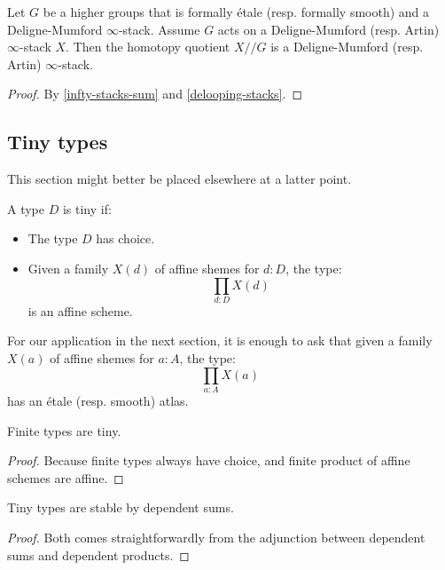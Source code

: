 \begin{corollary}
Let $G$ be a higher groups that is formally étale (resp. formally smooth) and a Deligne-Mumford $\infty$-stack. Assume $G$ acts on a Deligne-Mumford (resp. Artin) $\infty$-stack $X$. Then the homotopy quotient $X//G$ is a Deligne-Mumford (resp. Artin) $\infty$-stack.
\end{corollary}

\begin{proof}
By \cref{infty-stacks-sum} and \cref{delooping-stacks}.
\end{proof}

\subsection{Tiny types}

This section might better be placed elsewhere at a latter point.

\begin{definition}
A type $D$ is tiny if:
\begin{itemize}
\item The type $D$ has choice.
\item Given a family $X(d)$ of affine shemes for $d:D$, the type:
\[\prod_{d:D}X(d)\] 
is an affine scheme.
\end{itemize}
\end{definition}

\begin{remark}
For our application in the next section, it is enough to ask that given a family $X(a)$ of affine shemes for $a:A$, the type:
\[\prod_{a:A}X(a)\] 
has an étale (resp. smooth) atlas.
\end{remark}

\begin{lemma}
Finite types are tiny.
\end{lemma}

\begin{proof}
Because finite types always have choice, and finite product of affine schemes are affine.
\end{proof}

\begin{lemma}\label{tiny-sums}
Tiny types are stable by dependent sums.
\end{lemma}

\begin{proof}
Both comes straightforwardly from the adjunction between dependent sums and dependent products.
\end{proof}

